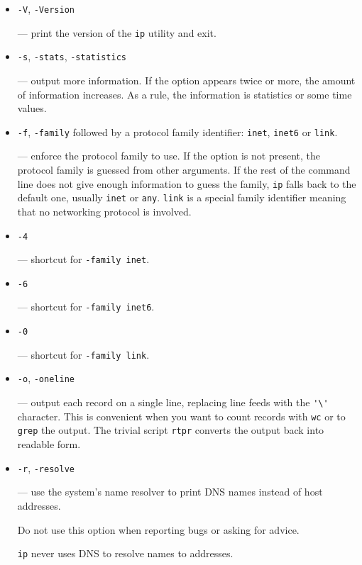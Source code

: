 \begin{itemize}
\item \verb|-V|, \verb|-Version|

--- print the version of the \verb|ip| utility and exit.


\item \verb|-s|, \verb|-stats|, \verb|-statistics|

--- output more information. If the option
appears twice or more, the amount of information increases.
As a rule, the information is statistics or some time values.


\item \verb|-f|, \verb|-family| followed by a protocol family
identifier: \verb|inet|, \verb|inet6| or \verb|link|.

--- enforce the protocol family to use. If the option is not present,
the protocol family is guessed from other arguments. If the rest of the command
line does not give enough information to guess the family, \verb|ip| falls back to the default
one, usually \verb|inet| or \verb|any|. \verb|link| is a special family
identifier meaning that no networking protocol is involved.

\item \verb|-4|

--- shortcut for \verb|-family inet|.

\item \verb|-6|

--- shortcut for \verb|-family inet6|.

\item \verb|-0|

--- shortcut for \verb|-family link|.


\item \verb|-o|, \verb|-oneline|

--- output each record on a single line, replacing line feeds
with the \verb|'\'| character. This is convenient when you want to
count records with \verb|wc| or to \verb|grep| the output. The trivial
script \verb|rtpr| converts the output back into readable form.

\item \verb|-r|, \verb|-resolve|

--- use the system's name resolver to print DNS names instead of
host addresses.

\begin{NB}
 Do not use this option when reporting bugs or asking for advice.
\end{NB}
\begin{NB}
 \verb|ip| never uses DNS to resolve names to addresses.
\end{NB}

\end{itemize}

